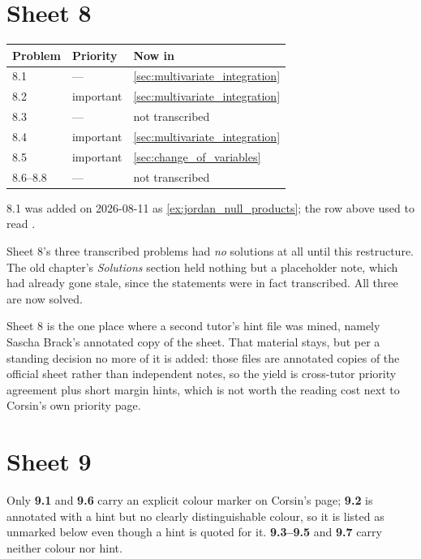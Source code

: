 \section{Sheet 8}
\label{sec:sheet_index_8}

\begin{center}
\begin{tabular}{@{}l l l@{}}
\textbf{Problem} & \textbf{Priority} & \textbf{Now in} \\
\hline
8.1 & --- & \cref{sec:multivariate_integration} \\[3pt]
8.2 & important & \cref{sec:multivariate_integration} \\[3pt]
8.3 & --- & not transcribed \\[3pt]
8.4 & important & \cref{sec:multivariate_integration} \\[3pt]
8.5 & important & \cref{sec:change_of_variables} \\[3pt]
8.6--8.8 & --- & not transcribed \\
\end{tabular}
\end{center}

\begin{ainote}
8.1 was added on 2026-08-11 as \cref{ex:jordan_null_products}; the row above used to read
.

Sheet 8's three transcribed problems had \emph{no} solutions at all until this restructure. The
old chapter's \emph{Solutions} section held nothing but a placeholder note, which had already
gone stale, since the statements were in fact transcribed. All three are now solved.

Sheet 8 is the one place where a second tutor's hint file was mined, namely Sascha Brack's
annotated copy of the sheet. That material stays, but per a standing decision no more of it is
added: those files are annotated copies of the official sheet rather than independent notes, so
the yield is cross-tutor priority agreement plus short margin hints, which is not worth the
reading cost next to Corsin's own priority page.
\end{ainote}

\section{Sheet 9}
\label{sec:sheet_index_9}

Only \textbf{9.1} and \textbf{9.6} carry an explicit colour marker on Corsin's page;
\textbf{9.2} is annotated with a hint but no clearly distinguishable colour, so it is listed as
unmarked below even though a hint is quoted for it. \textbf{9.3--9.5} and \textbf{9.7} carry
neither colour nor hint.

